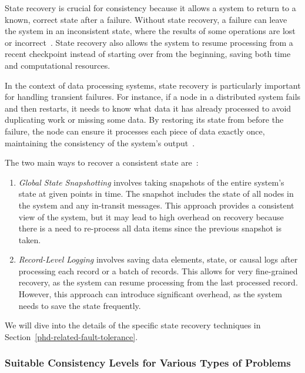 State recovery is crucial for consistency because it allows a system to return to a known, correct state after a failure. Without state recovery, a failure can leave the system in an inconsistent state, where the results of some operations are lost or incorrect~\cite{Carbone:2017:SMA:3137765.3137777, Akidau:2013:MFS:2536222.2536229}. State recovery also allows the system to resume processing from a recent checkpoint instead of starting over from the beginning, saving both time and computational resources.

In the context of data processing systems, state recovery is particularly important for handling transient failures. For instance, if a node in a distributed system fails and then restarts, it needs to know what data it has already processed to avoid duplicating work or missing some data. By restoring its state from before the failure, the node can ensure it processes each piece of data exactly once, maintaining the consistency of the system's output~\cite{silvestre2021clonos, Carbone:2017:SMA:3137765.3137777, wang2021consistency}.

The two main ways to recover a consistent state are~\cite{fragkoulis2024survey, zhang2024survey}:

\begin{enumerate}
    \item {\em Global State Snapshotting} involves taking snapshots of the entire system's state at given points in time. The snapshot includes the state of all nodes in the system and any in-transit messages. This approach provides a consistent view of the system, but it may lead to high overhead on recovery because there is a need to re-process all data items since the previous snapshot is taken.
    \item {\em Record-Level Logging} involves saving data elements, state, or causal logs after processing each record or a batch of records. This allows for very fine-grained recovery, as the system can resume processing from the last processed record. However, this approach can introduce significant overhead, as the system needs to save the state frequently.
\end{enumerate}

We will dive into the details of the specific state recovery techniques in Section~\ref{phd-related-fault-tolerance}.

\subsubsection{Suitable Consistency Levels for Various Types of Problems}


